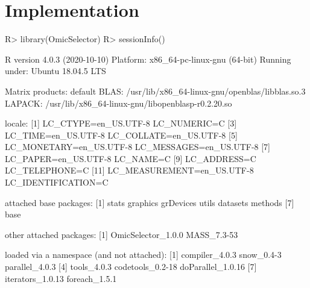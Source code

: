 \documentclass[article]{jss}
\begin{document}
\section{Implementation} \label{sec:implementation}

\begin{Schunk}
\begin{Sinput}
R> library(OmicSelector)
R> sessionInfo()
\end{Sinput}
\begin{Soutput}
R version 4.0.3 (2020-10-10)
Platform: x86_64-pc-linux-gnu (64-bit)
Running under: Ubuntu 18.04.5 LTS

Matrix products: default
BLAS:   /usr/lib/x86_64-linux-gnu/openblas/libblas.so.3
LAPACK: /usr/lib/x86_64-linux-gnu/libopenblasp-r0.2.20.so

locale:
 [1] LC_CTYPE=en_US.UTF-8       LC_NUMERIC=C              
 [3] LC_TIME=en_US.UTF-8        LC_COLLATE=en_US.UTF-8    
 [5] LC_MONETARY=en_US.UTF-8    LC_MESSAGES=en_US.UTF-8   
 [7] LC_PAPER=en_US.UTF-8       LC_NAME=C                 
 [9] LC_ADDRESS=C               LC_TELEPHONE=C            
[11] LC_MEASUREMENT=en_US.UTF-8 LC_IDENTIFICATION=C       

attached base packages:
[1] stats     graphics  grDevices utils     datasets  methods  
[7] base     

other attached packages:
[1] OmicSelector_1.0.0 MASS_7.3-53       

loaded via a namespace (and not attached):
[1] compiler_4.0.3    snow_0.4-3        parallel_4.0.3   
[4] tools_4.0.3       codetools_0.2-18  doParallel_1.0.16
[7] iterators_1.0.13  foreach_1.5.1    
\end{Soutput}
\end{Schunk}
\end{document}
